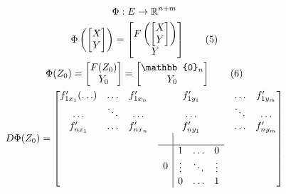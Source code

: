 \documentclass[main]{subfiles}
\begin{document}
         \begin{longProof}
            \begin{gather*}
          \Phi: E \rightarrow {\vR}^{n+m} \\ 
           \Phi\left(\begin{bmatrix*}
            X \\
            Y \end{bmatrix*}\right) = \begin{bmatrix*}
               F\left(\begin{bmatrix*}
                  X\\
                  Y
               \end{bmatrix*}\right) \\
               Y
            \end{bmatrix*} \tag{5} \\
             \Phi(Z_0) = \begin{bmatrix*}
               F(Z_0) \\
               Y_0
            \end{bmatrix*} = \begin{bmatrix*}
               \mathbb{0}_n \\
               Y_0
            \end{bmatrix*} \tag{6} \\
            D \Phi(Z_0) = \begin{bmatrix*}
               f^\prime_{1x_1}(\ldots) & \ldots & f^\prime_{1x_n} &f^\prime_{1y_1} & \ldots & f^\prime_{1y_m} \\
               \ldots & \ddots & \ldots & \ldots & \ddots & \ldots \\
               f^\prime_{nx_1} & \ldots & f^\prime_{nx_n} & f^\prime_{ny_1} & \ldots & f^\prime_{ny_m} \\
                & & &  \begin{array}{c|c}
                    & \\
                  \hline
                  0 & \begin{matrix}
                     1 & \ldots & 0 \\
                     \vdots & \ddots & \vdots \\
                     0 & \ldots & 1
                  \end{matrix} \\
               \end{array} & &
            \end{bmatrix*}  \\

\end{gather*}
\end{longProof}
\end{document}
